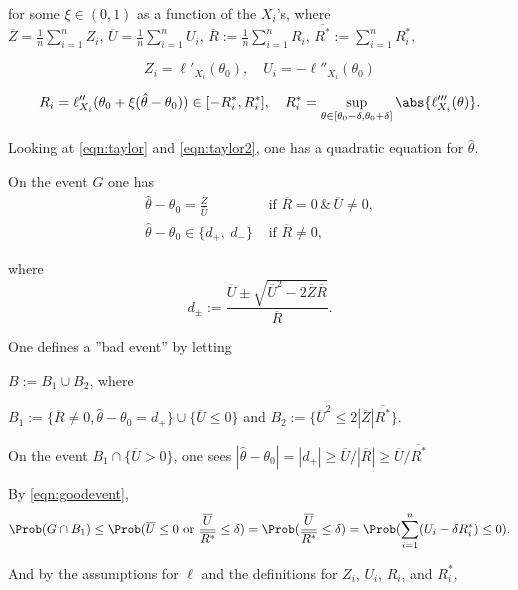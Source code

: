 for some $\xi\in (0,1)$ as a function of the $X_i$'s, where $\overline{Z}=\frac{1}{n}\sum_{i=1}^n Z_i,\, \overline{U}=\frac{1}{n}\sum_{i=1}^{n}U_{i},\, \overline{R}:=\frac{1}{n}\sum_{i=1}^{n}R_{i},\,
\overline{R^{*}}:=\sum_{i=1}^{n}R_{i}^{*},$

\begin{equation}\label{eqn:Z}
Z_i = \ell'_{X_i}(\theta_0),\quad U_i=-\ell''_{X_i}(\theta_0)
\end{equation}

\begin{equation}\label{eqn:R}
R_i = \ell''_{X_i}(\theta_0 + \xi(\hat{\theta}-\theta_0))\in [-R_i^{*},R_i^{*}], \quad R_i^{*}=\sup_{\theta\in [\theta_0-\delta,\theta_0+\delta]} \abs{\ell'''_{X_i}(\theta)}.
\end{equation}

Looking at \eqref{eqn:taylor} and \eqref{eqn:taylor2}, one has a quadratic equation for $\hat{\theta}$.

On the event $G$ one has
\begin{align*}
\hat{\theta}-\theta_{0}=\frac{\overline{Z}}{\overline{U}} &\textrm{ if } \overline{R}=0\, \&\, \overline{U}\neq 0, \\
\hat{\theta}-\theta_{0}\in\{d_{+},\ d_{-}\} &\textrm{ if } \overline{R}\neq 0,
\end{align*}

where
$$
d_{\pm}:=\frac{\overline{U}\pm\sqrt{\overline{U}^{2}-2\overline{Z}\overline{R}}}{\overline{R}}.
$$

One defines a ''bad event'' by letting

$B :=B_{1}\cup B_{2}$, where

$B_{1} :=\{\overline{R}\neq 0,\hat{\theta}-\theta_{0}=d_{+}\}\cup\{\overline{U}\leq 0\}$ and $B_{2} :=\{\overline{U}^{2}\leq 2|\overline{Z}|\overline{R^{*}}\}.$

On the event $B_1 \cap \{\overline{U}>0\}$, one sees $|\hat{\theta}-\theta_{0}|=|d_{+}|\geq \overline{U}/|\overline{R}|\geq\overline{U}/\overline{R^{*}}$

By \eqref{eqn:goodevent},
\begin{equation}\label{eqn:bound_intersection}
\Prob(G\cap B_{1})\leq \Prob(\overline{U}\leq 0 \textrm{ or } \frac{\overline{U}}{\overline{R^{*}}}\leq \delta) =\Prob( \frac{\overline{U}}{\overline{R^{*}}}\leq \delta)=\Prob(\sum_{i=1}^{n}(U_{i}-\delta R_{i}^{*})\leq 0).
\end{equation}

And by the assumptions for $\ell$ and the definitions for $Z_i$, $U_i$, $R_i$, and $R^{*}_i$,

